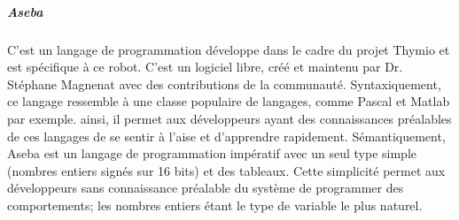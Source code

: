                 \subparagraph{Aseba}\label{sec:Aseba}
                    C'est un langage de programmation développe dans le cadre du projet Thymio et est spécifique à ce robot. C'est un logiciel libre, créé et maintenu par Dr. Stéphane Magnenat avec des contributions de la communauté. 
                    Syntaxiquement, ce langage ressemble à une classe populaire de langages, comme Pascal et Matlab par exemple. ainsi, il permet aux développeurs ayant des connaissances préalables de ces langages de se sentir à l'aise et d'apprendre rapidement. Sémantiquement, Aseba est un langage de programmation impératif avec un seul type simple (nombres entiers signés sur 16 bits) et des tableaux. Cette simplicité permet aux développeurs sans connaissance préalable du système de programmer des comportements; les nombres entiers étant le type de variable le plus naturel.
